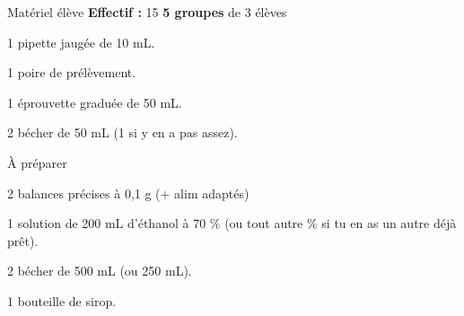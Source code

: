 
\begin{boiteMateriel}{Matériel élève}
  \textbf{Effectif :} 15
  \qq{}\qq{}
  \flecheLongue \textbf{5 groupes} de 3 élèves

  \begin{multicols}{2}
    \begin{protocole}
      \item 1 pipette jaugée de 10 mL.
      \item 1 poire de prélèvement.
      \item 1 éprouvette graduée de 50 mL.
      \item 2 bécher de 50 mL (1 si y en a pas assez).
    \end{protocole}
  \end{multicols}
\end{boiteMateriel}


\begin{boiteMateriel}{À préparer}
    \begin{protocole}
      \item 2 balances précises à 0,1 g (+ alim adaptés)
      \item 1 solution de 200 mL d'éthanol à 70 $\%$ (ou tout autre $\%$ si tu en as un autre déjà prêt).
      \item 2 bécher de 500 mL (ou 250 mL).
      \item 1 bouteille de sirop.
    \end{protocole}
\end{boiteMateriel}